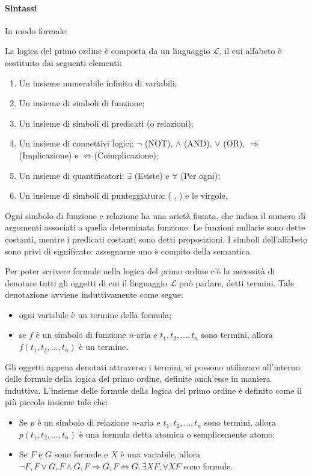 \paragraph*{Sintassi}
In modo formale:
\begin{definition}
  La logica del primo ordine è composta da un linguaggio \(\mathcal L\), il cui alfabeto è costituito dai seguenti elementi:
  \begin{enumerate}
    \item Un insieme numerabile infinito di variabili;
    \item Un insieme di simboli di funzione;
    \item Un insieme di simboli di predicati (o relazioni);
    \item Un insieme di connettivi logici: \(\lnot\) (NOT), \(\wedge\) (AND), \(\vee\) (OR), \(\Rightarrow\) (Implicazione) e \(\Leftrightarrow \)(Coimplicazione);
    \item Un insieme di quantificatori: \(\exists\) (Esiste) e \(\forall\) (Per ogni);
    \item Un insieme di simboli di punteggiatura: ( , ) e le virgole.
  \end{enumerate}
  Ogni simbolo di funzione e relazione ha una arietà fissata, che indica il numero di argomenti associati a quella determinata funzione. Le funzioni nullarie sono dette costanti, mentre i predicati costanti sono detti proposizioni. I simboli dell'alfabeto sono privi di significato: assegnarne uno è compito della semantica.
\end{definition}

Per poter scrivere formule nella logica del primo ordine c'è la necessità di denotare tutti gli oggetti di cui il linguaggio \(\mathcal L\) può parlare, detti termini. Tale denotazione avviene induttivamente come segue:
\begin{itemize}
  \item ogni variabile è un termine della formula;
  \item se \(f\) è un simbolo di funzione \(n\)-aria e \(t_1, t_2, ..., t_n\) sono termini, allora \(f(t_1, t_2,...,t_n)\) è un termine.
\end{itemize}

Gli oggetti appena denotati attraverso i termini, si possono utilizzare all'interno delle formule della logica del primo ordine, definite anch'esse in maniera induttiva. L'insieme delle formule della logica del primo ordine è definito come il più piccolo insieme tale che:
\begin{itemize}
  \item Se \(p\) è un simbolo di relazione \(n\)-aria e \(t_1, t_2,...,t_n\) sono termini, allora \(p(t_1, t_2,...,t_n)\) è una formula detta atomica o semplicemente atomo;
  \item Se \(F\) e \(G\) sono formule e \(X\) è una variabile, allora \(\lnot F, F\vee G, F\wedge G, F \Rightarrow G, F \Leftrightarrow G, \exists XF, \forall XF\) sono formule.
\end{itemize}

